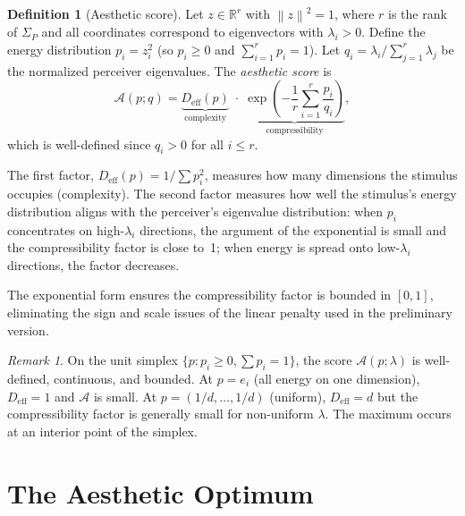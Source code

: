 \documentclass[journal]{IEEEtran}
\theoremstyle{definition}
\newtheorem{definition}[theorem]{Definition}
\theoremstyle{remark}
\newtheorem{remark}[theorem]{Remark}
\newcommand{\R}{\mathbb{R}}
\newcommand{\norm}[1]{\left\lVert #1 \right\rVert}
\begin{document}
\begin{definition}[Aesthetic score]
\label{def:score}
Let $z \in \R^r$ with $\norm{z}^2 = 1$, where $r$ is the rank of
$\Sigma_P$ and all coordinates correspond to eigenvectors with
$\lambda_i > 0$.  Define the energy distribution $p_i = z_i^2$
(so $p_i \geq 0$ and $\sum_{i=1}^r p_i = 1$).  Let
$q_i = \lambda_i / \sum_{j=1}^r \lambda_j$ be the normalized
perceiver eigenvalues.  The \emph{aesthetic score} is
\begin{equation}
    \mathcal{A}(p; q) =
    \underbrace{D_{\mathrm{eff}}(p)}_{\text{complexity}}
    \;\cdot\;
    \underbrace{\exp\!\left(-\frac{1}{r}\sum_{i=1}^r
    \frac{p_i}{q_i}\right)}_{\text{compressibility}},
    \label{eq:score}
\end{equation}
which is well-defined since $q_i > 0$ for all $i \leq r$.
\end{definition}

The first factor, $D_{\mathrm{eff}}(p) = 1/\sum p_i^2$, measures
how many dimensions the stimulus occupies (complexity).  The second
factor measures how well the stimulus's energy distribution aligns
with the perceiver's eigenvalue distribution: when $p_i$ concentrates
on high-$\lambda_i$ directions, the argument of the exponential is
small and the compressibility factor is close to~1; when energy is
spread onto low-$\lambda_i$ directions, the factor decreases.

The exponential form ensures the compressibility factor is bounded
in $[0, 1]$, eliminating the sign and scale issues of the linear
penalty used in the preliminary version.

\begin{remark}
On the unit simplex $\{p : p_i \geq 0, \sum p_i = 1\}$, the
score $\mathcal{A}(p; \lambda)$ is well-defined, continuous,
and bounded.  At $p = e_i$ (all energy on one dimension),
$D_{\mathrm{eff}} = 1$ and $\mathcal{A}$ is small.  At
$p = (1/d, \ldots, 1/d)$ (uniform), $D_{\mathrm{eff}} = d$
but the compressibility factor is generally small for non-uniform
$\lambda$.  The maximum occurs at an interior point of the simplex.
\end{remark}


\section{The Aesthetic Optimum}
\label{sec:optimum}
\end{document}
